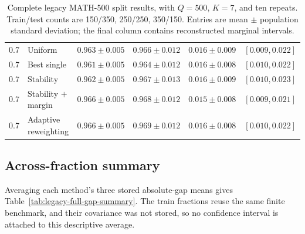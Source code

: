 \begin{table}[p]
\begin{tabular}{clcccc}
0.7 & Uniform & \(0.963\mathbin{\pm}0.005\) & \(0.966\mathbin{\pm}0.012\) & \(0.016\mathbin{\pm}0.009\) & \([0.009,0.022]\) \\
0.7 & Best single & \(0.961\mathbin{\pm}0.005\) & \(0.964\mathbin{\pm}0.012\) & \(0.016\mathbin{\pm}0.008\) & \([0.010,0.022]\) \\
0.7 & Stability & \(0.962\mathbin{\pm}0.005\) & \(0.967\mathbin{\pm}0.013\) & \(0.016\mathbin{\pm}0.009\) & \([0.010,0.023]\) \\
0.7 & Stability \(+\) margin & \(0.966\mathbin{\pm}0.005\) & \(0.968\mathbin{\pm}0.012\) & \(0.015\mathbin{\pm}0.008\) & \([0.009,0.021]\) \\
0.7 & Adaptive reweighting & \(0.966\mathbin{\pm}0.005\) & \(0.969\mathbin{\pm}0.012\) & \(0.016\mathbin{\pm}0.008\) & \([0.010,0.022]\) \\
\bottomrule
\end{tabular}
\caption{Complete legacy MATH-500 split results, with \(Q=500\), \(K=7\), and ten repeats.  Train/test counts are 150/350, 250/250, 350/150.  Entries are mean \(\mathbin{\pm}\) population standard deviation; the final column contains reconstructed marginal intervals.}
\label{tab:legacy-full-math500}
\end{table}

\clearpage
\subsection{Across-fraction summary}

Averaging each method's three stored absolute-gap means gives Table~\ref{tab:legacy-full-gap-summary}.  The train fractions reuse the same finite benchmark, and their covariance was not stored, so no confidence interval is attached to this descriptive average.

\begin{table}[t]
\centering
\scriptsize
{}
\caption{Legacy mean absolute train--test gaps averaged over training fractions.  The descriptive change from \(0.0831\) for raw ERM to \(0.0717\) for stability plus margin is \(13.67\%\); it is neither a clean excess-risk estimate nor a comparison with calibrated buffered ERM.}
\label{tab:legacy-full-gap-summary}
\end{table}

